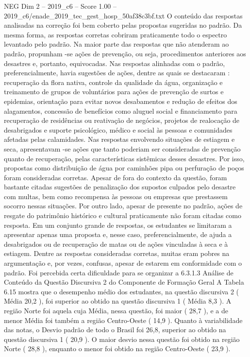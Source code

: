 \begin{textsample}{NEG Dim 2 – 2019\_c6 – Score 1.00 – 2019\_c6/enade\_2019\_tec\_gest\_hosp\_50af38c3bf.txt}
O conteúdo das respostas analisadas na correção foi bem coberto pelas propostas sugeridas no padrão.
Da mesma forma, as respostas corretas cobriram praticamente todo o espectro levantado pelo padrão.
Na maior parte das respostas que não atenderam ao padrão, propunham -se ações de prevenção, ou seja, procedimentos anteriores aos desastres e, portanto, equivocadas.
Nas respostas alinhadas com o padrão, preferencialmente, havia sugestões de ações, dentre as quais se destacaram : recuperação da flora nativa, controle da qualidade da água, organização e treinamento de grupos de voluntários para ações de prevenção de surtos e epidemias, orientação para evitar novos desabamentos e redução de efeitos dos alagamentos, concessão de benefícios como aluguel social e financiamento para recuperação de residências ou reativação de negócios, projetos de realocação de desabrigados e suporte psicológico, médico e social às pessoas e comunidades afetadas pelas calamidades.
Nas respostas envolvendo situações de estiagem e seca, apresentavam -se ações que tanto poderiam ser consideradas de prevenção quanto de recuperação, pelas características sistêmicas desses desastres.
Por isso, propostas como distribuição de água por caminhões pipa ou perfuração de poços foram consideradas corretas.
Apesar de fora do contexto da questão, foram bastante citadas sugestões de penalização dos supostos culpados pelo desastre com multas, bem como recompensa às pessoas ou empresas que prestassem socorro nessas situações.
Por outro lado, apesar de presente no padrão, ações de resgate do patrimônio histórico e cultural praticamente não foram citadas como resposta.
Em um conjunto grande de respostas, os estudantes se limitaram a apresentar apenas uma proposta e, nesse caso, preferencialmente, de ajuda a desabrigados ou de recuperação de matas ou de ações vinculadas à seca e à estiagem.
Dentre as respostas consideradas corretas, muitas eram pobres na argumentação e, por vezes, confusas, apesar de estarem em conformidade com o padrão.
Foi percebida certa dificuldade para se organizar a 6.3.1.3 Análise de Conteúdo da Questão Discursiva 2 do Componente de Formação Geral A Tabela 6.15 mostra que o desempenho médio dos estudantes, na questão discursiva 2 ( Média 20,2 ), foi superior ao obtido na questão discursiva 1 ( Média 8,3 ).
A região Norte foi aquela cuja Média, nessa questão, foi maior ( 28,7 ), e a de menor Média foi também a região Centro-Oeste ( 14,9 ).
Quanto à variabilidade das notas, o Desvio padrão de todo o Brasil foi 26,8, superior ao obtido na questão discursiva 1 ( 20,9 ).
O maior desvio nessa questão foi obtido na região Norte ( 28,8 ), enquanto o menor foi obtido na região Centro-Oeste ( 23,9 ).

\end{textsample}
